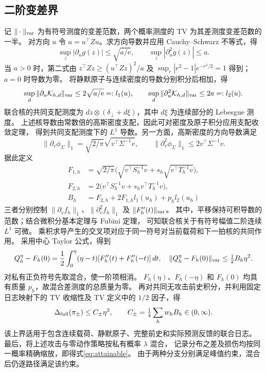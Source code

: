 \subsection{二阶变差界}
记 $\|\cdot\|_{\rm var}$ 为有符号测度的变差范数，两个概率测度的 TV 为其差测度变差范数的一半。
对方向 $u$ 令 $a=u^\top Zu$。求方向导数并应用 Cauchy--Schwarz 不等式，得
\begin{equation}
 \sup_z|\partial_u g(z)|\le\sqrt{a/\mathrm e},\qquad
 \sup_z|\partial_u^2g(z)|\le a.
\end{equation}
当 $a>0$ 时，第二式由 $z^\top Zz\ge(u^\top Zz)^2/a$ 及
$\sup_r|r^2-1|e^{-r^2/2}=1$ 得到；$a=0$ 时导数为零。
将静默原子与连续密度的导数分别积分后相加，得
\begin{equation}
 \sup_d\|\partial_u\mathcal K_{h,d}\|_{\rm var}\le2\sqrt{a/\mathrm e}=:l_1(u),\qquad
 \sup_d\|\partial_u^2\mathcal K_{h,d}\|_{\rm var}\le2a=:l_2(u).
 \label{eq:kernel-derivatives}
\end{equation}
联合核的共同支配测度为 $dz\otimes(\delta_\bot+d\xi)$，其中 $d\xi$ 为连续部分的 Lebesgue 测度。
上述核导数由常数倍的高斯密度支配，因此可对密度及原子积分应用支配收敛定理，
得到共同支配测度下的 $L^1$ 导数。另一方面，高斯密度的方向导数满足
\begin{equation}
 \|\partial_v\phi_\Sigma\|_1=\sqrt{2/\pi}\sqrt{v^\top\Sigma^{-1}v},\qquad
 \|\partial_v^2\phi_\Sigma\|_1\le2v^\top\Sigma^{-1}v.
\end{equation}
据此定义
\begin{equation}
 \begin{aligned}
 F_{1,h}&=\sqrt{2/\pi}\big(\sqrt{v^\top S_h^{-1}v}+s_h\sqrt{v^\top T_h^{-1}v}\big),\\
 F_{2,h}&=2\big(v^\top S_h^{-1}v+s_hv^\top T_h^{-1}v\big),\\
 B_h&=F_{2,h}+2F_{1,h}l_1(u_h)+p_hl_2(u_h)
 \end{aligned}
 \label{eq:Bh}
\end{equation}
三者分别控制 $\|\partial_v f_h\|_1$、$\|\partial_v^2f_h\|_1$ 及 $\|F_h''(t)\|_{\rm var}$。
其中，平移保持可积导数的范数；结合微积分基本定理与 Fubini 定理，
可知联合核关于有符号幅值二阶连续 $L^1$ 可微。
乘积求导产生的交叉项对应于同一符号对当前载荷和下一拍核的共同作用。
采用中心 Taylor 公式，得到
\begin{equation}
 Q_h^\eta-F_h(0)=\frac12\int_0^\eta(\eta-t)[F_h''(t)+F_h''(-t)]\,dt,
 \quad \|Q_h^\eta-F_h(0)\|_{\rm var}\le\tfrac12B_h\eta^2.
\end{equation}
对私有正负符号先取混合，使一阶项相消。
$F_h(\eta)$、$F_h(-\eta)$ 和 $F_h(0)$ 均具有质量 $p_h$，故混合差测度的总质量为零。
再对共同无攻击前史积分，并利用固定日志映射下的 TV 收缩性及 TV 定义中的 $1/2$ 因子，得
\begin{equation}
 \Delta_{\rm full}(\pi_\pm)\le C_\pm\eta^2,\qquad
 C_\pm=\tfrac14\sum_hw_hB_h\in(0,\infty).
 \label{eq:Cpm}
\end{equation}
该上界适用于包含连续载荷、静默原子、完整前史和实际预测反馈的联合日志。
最后，将上述攻击与零动作策略按私有概率 $\lambda$ 混合，
记录分布之差及损伤均按同一概率精确缩放，即得式\eqref{eq:attainable}。
由于两种分支分别满足峰值约束，混合后仍逐路径满足该约束。

